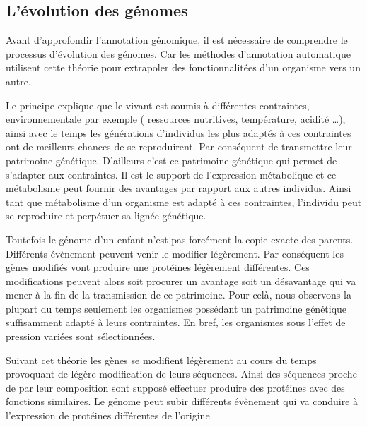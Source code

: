 \begin{refsection}
    \subsection{L’évolution des génomes}
    Avant d'approfondir l’annotation génomique, il est nécessaire de comprendre le processus d’évolution des génomes. Car les méthodes d’annotation automatique utilisent cette théorie pour extrapoler des fonctionnalitées d’un organisme vers un autre.
    
    Le principe explique que le vivant est soumis à différentes contraintes, environnementale par exemple ( ressources nutritives, température, acidité \ldots ), ainsi avec le temps les générations d’individus les plus adaptés à ces contraintes ont de meilleurs chances de se reproduirent. Par conséquent de transmettre leur patrimoine génétique. D’ailleurs c’est ce patrimoine génétique qui permet de s’adapter aux contraintes. Il est le support de l’expression métabolique et ce métabolisme peut fournir des avantages par rapport aux autres individus. Ainsi tant que métabolisme d’un organisme est adapté à ces contraintes, l’individu peut se reproduire et perpétuer sa lignée génétique.
    
    Toutefois le génome d’un enfant n’est pas forcément la copie exacte des parents. Différents évènement peuvent venir le modifier légèrement. Par conséquent les gènes modifiés vont produire une protéines légèrement différentes. Ces modifications peuvent alors soit procurer un avantage soit un désavantage qui va mener à la fin de la transmission de ce patrimoine. Pour celà, nous observons la plupart du temps seulement les organismes possédant un patrimoine génétique suffisamment adapté à leurs contraintes. En bref, les organismes sous l’effet de pression variées sont sélectionnées.
    
    Suivant cet théorie les gènes se modifient légèrement au cours du temps provoquant de légère modification de leurs séquences. Ainsi des séquences proche de par leur composition sont supposé effectuer produire des protéines avec des fonctions similaires. Le génome peut subir différents évènement qui va conduire à l’expression de protéines différentes de l’origine. 
    

\end{refsection}
